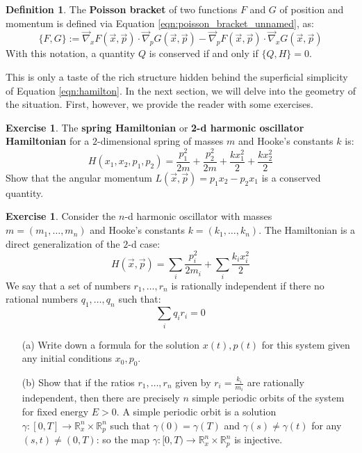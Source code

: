 \documentclass[12pt]{article}
\theoremstyle{definition}
\newtheorem{definition}[theorem]{Definition}
\newtheorem{exercise}[theorem]{Exercise}
\numberwithin{equation}{section}
\newcommand{\R}{{\mathbb R}}
\begin{document}
\begin{definition} The {\bf Poisson bracket} of two functions $F$ and $G$ of position and momentum is defined via Equation \ref{eqn:poisson_bracket_unnamed}, as:
\begin{equation} \label{eqn:poisson_bracket}
\{F,G\} := \vec{\nabla}_x F(\vec{x},\vec{p}) \cdot \vec{\nabla}_p G(\vec{x},\vec{p}) - \vec{\nabla}_p F(\vec{x},\vec{p}) \cdot \vec{\nabla}_x G(\vec{x},\vec{p}) 
\end{equation}
 With this notation, a quantity $Q$ is conserved if and only if $\{Q,H\} = 0$.
\end{definition}

This is only a taste of the rich structure hidden behind the superficial simplicity of Equation \ref{eqn:hamilton}. In the next section, we will delve into the geometry of the situation. First, however, we provide the reader with some exercises.

\begin{exercise} The {\bf spring Hamiltonian} or {\bf 2-d harmonic oscillator Hamiltonian} for a $2$-dimensional spring of masses $m$ and Hooke's constants $k$ is:
\[
H(x_1,x_2,p_1,p_2) = \frac{p_1^2}{2m} + \frac{p_2^2}{2m}  + \frac{kx_1^2}{2} + \frac{kx_2^2}{2}
\]
Show that the angular momentum $L(\vec{x},\vec{p}) = p_1x_2 - p_2x_1$ is a conserved quantity.
\end{exercise}

\begin{exercise} Consider the $n$-d harmonic oscillator with masses $m = (m_1,\dots,m_n)$ and Hooke's constants $k = (k_1,\dots,k_n)$. The Hamiltonian is a direct generalization of the $2$-d case: 
\[
H(\vec{x},\vec{p}) = \sum_i \frac{p_i^2}{2m_i} + \sum_i \frac{k_i x_i^2}{2}
\]
We say that a set of numbers $r_1,\dots,r_n$ is rationally independent if there no rational numbers $q_1,\dots,q_n$ such that:
\[
\sum_i q_i r_i = 0
\]
\begin{itemize}
	\item[(a)] Write down a formula for the solution $x(t), p(t)$ for this system given any initial conditions $x_0,p_0$. 
	\item[(b)] Show that if the ratios $r_1,\dots,r_n$ given by $r_i = \frac{k_i}{m_i}$ are rationally independent, then there are precisely $n$ simple periodic orbits of the system for fixed energy $E > 0$. A simple periodic orbit is a solution $\gamma:[0,T] \to \R^n_x \times \R^n_p$ such that $\gamma(0) = \gamma(T)$ and $\gamma(s) \neq \gamma(t)$ for any $(s,t) \neq (0,T)$: so the map $\gamma:[0,T) \to \R^n_x \times \R^n_p$ is injective.
\end{itemize}
\end{exercise} 
\end{document}
